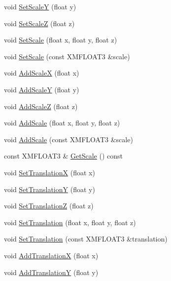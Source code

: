 \begin{DoxyCompactItemize}
\item 
void \hyperlink{structmage_1_1_transform_a77251bb29fbd26817c0b8c8aabb96ce4}{Set\+ScaleY} (float y)
\item 
void \hyperlink{structmage_1_1_transform_af8cd0167f776708697041544886ff2de}{Set\+ScaleZ} (float z)
\item 
void \hyperlink{structmage_1_1_transform_a6c7e193f6bfddb8c7af5c35b538cdee5}{Set\+Scale} (float x, float y, float z)
\item 
void \hyperlink{structmage_1_1_transform_a72e4788366a1638a80fd124e344d0d33}{Set\+Scale} (const X\+M\+F\+L\+O\+A\+T3 \&scale)
\item 
void \hyperlink{structmage_1_1_transform_afb49f4e4ca1772f8ed38465afcf414a0}{Add\+ScaleX} (float x)
\item 
void \hyperlink{structmage_1_1_transform_ae3213b5cc2b347236783389c1b717356}{Add\+ScaleY} (float y)
\item 
void \hyperlink{structmage_1_1_transform_aa493f3a588376d094ce50dfcffe0ece2}{Add\+ScaleZ} (float z)
\item 
void \hyperlink{structmage_1_1_transform_a10681b78ac7980fa3aa6c6c11a274f99}{Add\+Scale} (float x, float y, float z)
\item 
void \hyperlink{structmage_1_1_transform_a7f5092b95426c47a55bd3dff16cea31e}{Add\+Scale} (const X\+M\+F\+L\+O\+A\+T3 \&scale)
\item 
const X\+M\+F\+L\+O\+A\+T3 \& \hyperlink{structmage_1_1_transform_a6b2e52c03574ba7e1cd46cd8b8a3770c}{Get\+Scale} () const
\item 
void \hyperlink{structmage_1_1_transform_a003d84bc07835f17e8598dceda06d973}{Set\+TranslationX} (float x)
\item 
void \hyperlink{structmage_1_1_transform_ab2c63fbbe2dd2c40d841f8c37df24394}{Set\+TranslationY} (float y)
\item 
void \hyperlink{structmage_1_1_transform_aba982207d2d2d20cae2ba9d8496e8531}{Set\+TranslationZ} (float z)
\item 
void \hyperlink{structmage_1_1_transform_acf702bb57431be2986ca487e07189bda}{Set\+Translation} (float x, float y, float z)
\item 
void \hyperlink{structmage_1_1_transform_ad82e98f98d57cd3e9878336b6c3e804c}{Set\+Translation} (const X\+M\+F\+L\+O\+A\+T3 \&translation)
\item 
void \hyperlink{structmage_1_1_transform_aa4b8469fa07ab4ad3b50aaa34389967f}{Add\+TranslationX} (float x)
\item 
void \hyperlink{structmage_1_1_transform_aef8f3728f6d6d55e69689cff2af4c26f}{Add\+TranslationY} (float y)

\end{DoxyCompactItemize}
